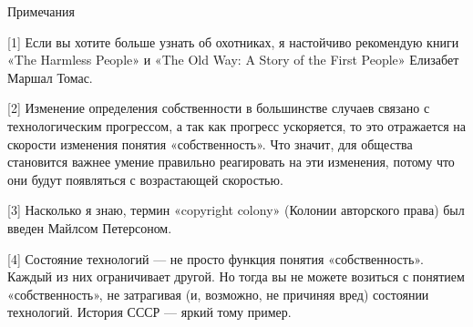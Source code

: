 \documentclass[ebook,12pt,oneside,openany]{memoir}
\begin{document}
Примечания

[1] Если вы хотите больше узнать об охотниках, я настойчиво рекомендую
книги «The Harmless People» и «The Old Way: A Story of the First
People» Елизабет Маршал Томас.

[2] Изменение определения собственности в большинстве случаев связано
с технологическим прогрессом, а так как прогресс ускоряется, то это
отражается на скорости изменения понятия «собственность». Что значит,
для общества становится важнее умение правильно реагировать на эти
изменения, потому что они будут появляться с возрастающей скоростью.

[3] Насколько я знаю, термин «copyright colony» (Колонии авторского
права) был введен Майлсом Петерсоном.

[4] Состояние технологий — не просто функция понятия «собственность».
Каждый из них ограничивает другой. Но тогда вы не можете возиться с
понятием «собственность», не затрагивая (и, возможно, не причиняя
вред) состоянии технологий. История СССР — яркий тому пример.
\end{document}
